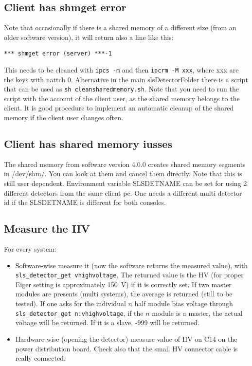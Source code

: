 \documentclass{article}
\begin{document}
\subsection{Client has \textbf{shmget error}}
Note that occasionally if there is a shared memory of a different size (from an older software version), it will return also a line like this:
\begin{verbatim}
*** shmget error (server) ***-1
\end{verbatim}
This needs to be cleaned with {\tt{ipcs -m}} and then {\tt{ipcrm -M xxx}}, where xxx are the keys with nattch 0. Alternative in the main slsDetectorFolder there is a script that can be used as {\tt{sh cleansharedmemory.sh}}. Note that you need to run the script with the account of the client user, as the shared memory belongs to the client. It is good procedure to implement an automatic cleanup of the shared memory if the client user changes often.   

\subsection{Client has shared memory iusses}
The shared memory from software version 4.0.0 creates shared memory segments in /dev/shm/. You can look at them and cancel them directly. Note that this is still user dependent.
Environment variable SLSDETNAME can be set for using 2 different detectors from the same client pc. One needs a different multi detector id if the SLSDETNAME is different for both consoles.

\subsection{Measure the HV}
For every system: 
\begin{itemize}
\item Software-wise measure it (now the software returns the measured value), with {\tt{sls\_detector\_get vhighvoltage}}. The returned value is the HV (for proper Eiger setting is approximately 150~V) if it is correctly set. If two master modules are presents (multi systems), the average is returned (still to be tested). If one asks for the individual $n$ half module bias voltage through {\tt{sls\_detector\_get n:vhighvoltage}}, if the $n$ module is a master, the actual voltage will be returned. If it is a slave, -999 will be returned. 
\item Hardware-wise (opening the detector) measure value of HV on C14 on the power distribution board. Check also that the small HV connector cable is really connected. 
 \end{itemize}
\end{document}
